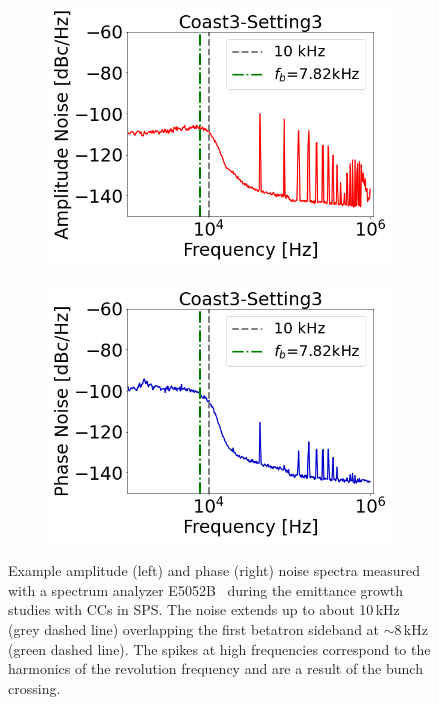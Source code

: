 \begin{figure}[!ht]
    \centering
    \begin{subfigure}[t]{0.45\textwidth}
        \centering
        \includegraphics[width=1\textwidth]{images/Ch6/Measured_spectrum_MD5_Coast3-Setting3-AN.csv_no_psd}
    \end{subfigure}
    \hfill
    \begin{subfigure}[t]{0.45\textwidth}
        \centering
        \includegraphics[width=1\textwidth]{images/Ch6/Measured_spectrum_MD5_Coast3-Setting3-PN.csv_no_psd}
    \end{subfigure}
    \hfill
     \caption{Example amplitude (left) and phase (right) noise spectra measured with a spectrum analyzer E5052B~\cite{E5052B_insight} during the emittance growth studies with CCs in SPS. The noise extends up to about 10\,kHz (grey dashed line) overlapping the first betatron sideband at $\sim$8\,kHz (green dashed line). The spikes at high frequencies correspond to the harmonics of the revolution frequency and are a result of the bunch crossing.} %
     \label{fig:example_PN_and_AN_coast3_setting3}
 \end{figure}

